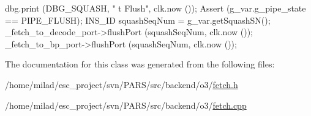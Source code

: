 \begin{DoxyCode}
                                    {
    dbg.print (DBG_SQUASH, "%
      t Flush", clk.now ());
    Assert (g_var.g_pipe_state == PIPE_FLUSH);
    INS_ID squashSeqNum = g_var.getSquashSN();
    _fetch_to_decode_port->flushPort (squashSeqNum, clk.now ());
    _fetch_to_bp_port->flushPort (squashSeqNum, clk.now ());
}
\end{DoxyCode}


The documentation for this class was generated from the following files:\begin{DoxyCompactItemize}
\item 
/home/milad/esc\_\-project/svn/PARS/src/backend/o3/\hyperlink{o3_2fetch_8h}{fetch.h}\item 
/home/milad/esc\_\-project/svn/PARS/src/backend/o3/\hyperlink{o3_2fetch_8cpp}{fetch.cpp}\end{DoxyCompactItemize}
